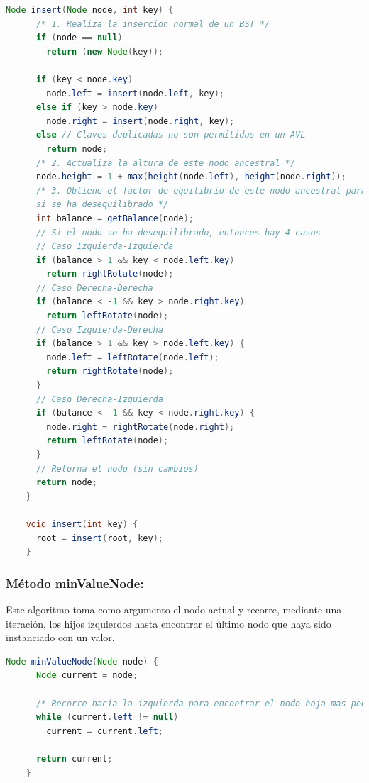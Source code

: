 \documentclass{article}
\begin{document}
  \begin{lstlisting}[language=Java, caption={Ejemplo de código Java}]
    Node insert(Node node, int key) {
      /* 1. Realiza la insercion normal de un BST */
      if (node == null)
        return (new Node(key));

      if (key < node.key)
        node.left = insert(node.left, key);
      else if (key > node.key)
        node.right = insert(node.right, key);
      else // Claves duplicadas no son permitidas en un AVL
        return node;
      /* 2. Actualiza la altura de este nodo ancestral */
      node.height = 1 + max(height(node.left), height(node.right));
      /* 3. Obtiene el factor de equilibrio de este nodo ancestral para comprobar
      si se ha desequilibrado */
      int balance = getBalance(node);
      // Si el nodo se ha desequilibrado, entonces hay 4 casos
      // Caso Izquierda-Izquierda
      if (balance > 1 && key < node.left.key)
        return rightRotate(node);
      // Caso Derecha-Derecha
      if (balance < -1 && key > node.right.key)
        return leftRotate(node);
      // Caso Izquierda-Derecha
      if (balance > 1 && key > node.left.key) {
        node.left = leftRotate(node.left);
        return rightRotate(node);
      }
      // Caso Derecha-Izquierda
      if (balance < -1 && key < node.right.key) {
        node.right = rightRotate(node.right);
        return leftRotate(node);
      }
      // Retorna el nodo (sin cambios)
      return node;
    }
    
    void insert(int key) {
      root = insert(root, key);
    }
  \end{lstlisting}
  

  \subsubsection{Método minValueNode: }Este algoritmo toma como argumento el nodo actual y recorre, mediante una iteración, 
  los hijos izquierdos hasta encontrar el último nodo que haya sido instanciado con un valor.
  \begin{lstlisting}[language=Java, caption={Ejemplo de código Java}]
    Node minValueNode(Node node) {
      Node current = node;

      /* Recorre hacia la izquierda para encontrar el nodo hoja mas pequeno */
      while (current.left != null)
        current = current.left;

      return current;
    }
  \end{lstlisting}
  
\end{document}
